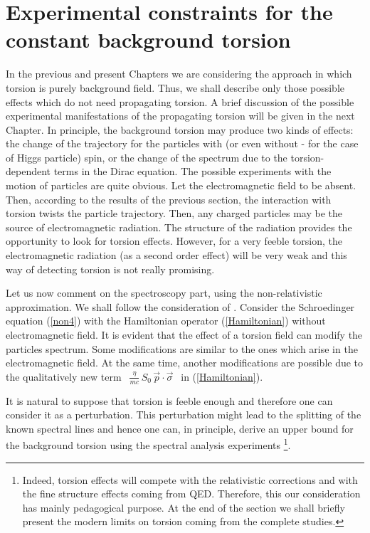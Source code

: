 \section{Experimental constraints for the constant background
torsion}

In the previous and present Chapters we are considering the approach 
in which torsion is purely background field. Thus, we shall describe
only those possible effects which do not need propagating 
torsion. A brief discussion of the possible experimental 
manifestations of the propagating torsion will be given in 
the next Chapter. In principle, the background torsion may 
produce two kinds of effects: the change of the trajectory 
for the particles with (or even without - for the case of 
Higgs particle) spin, or the change of the spectrum due 
to the torsion-dependent terms in the Dirac equation. 
The possible experiments with the motion of particles
are quite obvious. Let the electromagnetic field to be absent.
Then, according to the  results of the previous section,
the interaction with torsion twists the particle trajectory. 
Then, any charged particles may be the source of 
electromagnetic radiation. The structure of the radiation 
provides the opportunity to look for torsion effects.
However, for a very feeble torsion, the electromagnetic
radiation (as a second order effect) will be very weak
and this way of detecting torsion is not really promising.

Let us now comment on the spectroscopy 
part, using the non-relativistic approximation. We shall 
follow the consideration of \cite{babush}.  
Consider the Schroedinger equation (\ref{non4}) with the 
Hamiltonian operator (\ref{Hamiltonian}) without 
electromagnetic field. 
It is evident that the effect of a torsion field can modify
the particles spectrum. Some modifications are similar 
to the ones which arise in the electromagnetic field.
At the same time, another modifications
are possible due to the qualitatively new term
$\;\,\frac{\eta}{mc}\,S_0\, \vec{p}\cdot\vec{\sigma}\;\,$ in 
(\ref{Hamiltonian}).

It is natural to suppose that torsion is feeble enough and 
therefore one can consider it as a perturbation. This 
perturbation
might lead to the splitting of the known spectral lines and 
hence one can, in principle, derive an upper bound for 
the background torsion using the spectral analysis experiments
\footnote{Indeed, torsion effects will compete with the 
relativistic corrections and with the fine structure 
effects coming from QED. Therefore, this our consideration
has mainly pedagogical purpose. At the end of the section 
we shall briefly present the modern limits on torsion 
coming from the complete studies.}.

